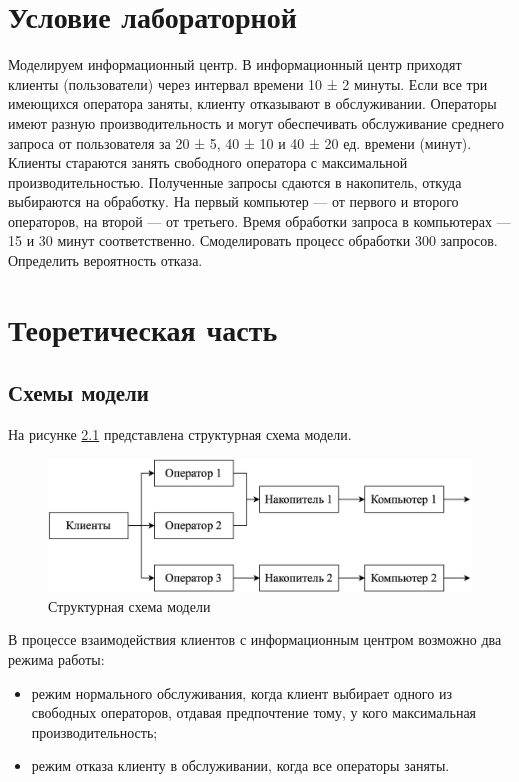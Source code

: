 \chapter{Условие лабораторной}

Моделируем информационный центр. В информационный центр приходят
клиенты (пользователи) через интервал времени 10 ± 2 минуты. Если все три
имеющихся оператора заняты, клиенту отказывают в обслуживании.
Операторы имеют разную производительность и могут обеспечивать обслуживание среднего запроса от пользователя за 20 ± 5, 40 ± 10 и 40 ± 20 ед.
времени (минут). Клиенты стараются занять свободного оператора с максимальной производительностью.
Полученные запросы сдаются в накопитель, откуда выбираются на обработку.
На первый компьютер — от первого и второго операторов, на второй --- от третьего.
Время обработки запроса в компьютерах — 15 и 30 минут соответственно.
Смоделировать процесс обработки 300 запросов. Определить вероятность
отказа.

\chapter{Теоретическая часть}

\section{Схемы модели}

На рисунке \ref{img:blockDiagram} представлена структурная схема модели.

\begin{figure}[ht!]
	\centering
	\includegraphics[width=0.6\linewidth]{img/blockDiagram.png}
	\caption{Структурная схема модели}
	\label{img:blockDiagram}
\end{figure}

В процессе взаимодействия клиентов с информационным центром возможно два режима работы:

\begin{itemize}
	\item режим нормального обслуживания, когда клиент выбирает одного из свободных операторов, отдавая предпочтение тому, у кого максимальная производительность;
	\item режим отказа клиенту в обслуживании, когда все операторы заняты.
\end{itemize}

